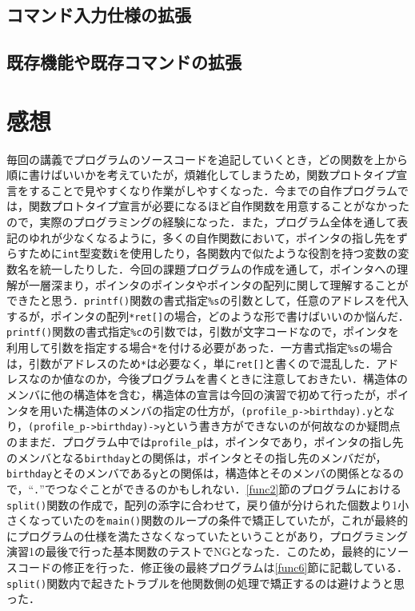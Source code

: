 \subsection{コマンド入力仕様の拡張}

\subsection{既存機能や既存コマンドの拡張}

\section{感想}\label{sec:review}

毎回の講義でプログラムのソースコードを追記していくとき，どの関数を上から順に書けばいいかを考えていたが，煩雑化してしまうため，関数プロトタイプ宣言をすることで見やすくなり作業がしやすくなった\cite{book:meikai}．今までの自作プログラムでは，関数プロトタイプ宣言が必要になるほど自作関数を用意することがなかったので，実際のプログラミングの経験になった．また，プログラム全体を通して表記のゆれが少なくなるように，多くの自作関数において，ポインタの指し先をずらすために\verb|int|型変数\verb|i|を使用したり，各関数内で似たような役割を持つ変数の変数名を統一したりした．今回の課題プログラムの作成を通して，ポインタへの理解が一層深まり，ポインタのポインタやポインタの配列に関して理解することができたと思う\cite{www:label3,www:label4}．\verb|printf()|関数の書式指定\verb|%s|の引数として，任意のアドレスを代入するが，ポインタの配列\verb|*ret[]|の場合，どのような形で書けばいいのか悩んだ．\verb|printf()|関数の書式指定\verb|%c|の引数では，引数が文字コードなので，ポインタを利用して引数を指定する場合\verb|*|を付ける必要があった．一方書式指定\verb|%s|の場合は，引数がアドレスのため\verb|*|は必要なく，単に\verb|ret[]|と書くので混乱した．アドレスなのか値なのか，今後プログラムを書くときに注意しておきたい．構造体のメンバに他の構造体を含む，構造体の宣言は今回の演習で初めて行ったが，ポインタを用いた構造体のメンバの指定の仕方が，\verb|(profile_p->birthday).y|となり，\verb|(profile_p->birthday)->y|という書き方ができないのが何故なのか疑問点のままだ．プログラム中では\verb|profile_p|は，ポインタであり，ポインタの指し先のメンバとなる\verb|birthday|との関係は，ポインタとその指し先のメンバだが，\verb|birthday|とそのメンバである\verb|y|との関係は，構造体とそのメンバの関係となるので，“\verb|.|”でつなぐことができるのかもしれない．\ref{func2}節のプログラムにおける\verb|split()|関数の作成で，配列の添字に合わせて，戻り値が分けられた個数より1小さくなっていたのを\verb|main()|関数のループの条件で矯正していたが，これが最終的にプログラムの仕様を満たさなくなっていたということがあり，プログラミング演習1の最後で行った基本関数のテストでNGとなった．このため，最終的にソースコードの修正を行った．修正後の最終プログラムは\ref{func6}節に記載している．\verb|split()|関数内で起きたトラブルを他関数側の処理で矯正するのは避けようと思った．

